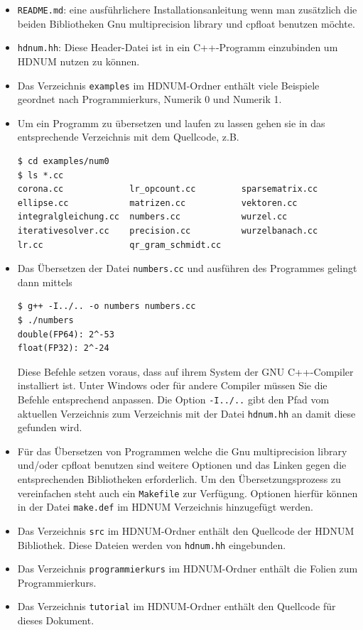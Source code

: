 \documentclass[a4paper,11pt]{article}
\theoremstyle{definition}
\begin{document}
\begin{itemize}
\item \lstinline{README.md}: eine ausführlichere Installationsanleitung wenn man zusätzlich die beiden Bibliotheken 
Gnu multiprecision library und cpfloat benutzen möchte.
\item \lstinline{hdnum.hh}: Diese Header-Datei ist in ein C++-Programm einzubinden um HDNUM
nutzen zu können.

\item Das Verzeichnis \lstinline{examples} im HDNUM-Ordner enthält viele Beispiele
geordnet nach Programmierkurs, Numerik 0 und Numerik 1.

\item Um ein Programm zu übersetzen und laufen zu lassen gehen sie in das entsprechende Verzeichnis mit dem Quellcode, z.B.
\begin{lstlisting}[basicstyle=\ttfamily\small,frame=single]
$ cd examples/num0
$ ls *.cc
corona.cc             lr_opcount.cc         sparsematrix.cc
ellipse.cc            matrizen.cc           vektoren.cc
integralgleichung.cc  numbers.cc            wurzel.cc
iterativesolver.cc    precision.cc          wurzelbanach.cc
lr.cc                 qr_gram_schmidt.cc
\end{lstlisting}


\item Das Übersetzen der Datei \lstinline{numbers.cc} und ausführen des Programmes gelingt dann mittels
\begin{lstlisting}[basicstyle=\ttfamily\small,frame=single]
$ g++ -I../.. -o numbers numbers.cc
$ ./numbers
double(FP64): 2^-53
float(FP32): 2^-24
\end{lstlisting}
Diese Befehle setzen voraus, dass auf ihrem System der GNU C++-Compiler installiert ist.
Unter Windows oder für andere Compiler müssen Sie die Befehle entsprechend anpassen.
Die Option \lstinline{-I../..} gibt den Pfad vom aktuellen Verzeichnis zum Verzeichnis mit der Datei \lstinline{hdnum.hh} an
damit diese gefunden wird. 
\item Für das Übersetzen von Programmen welche die Gnu multiprecision library und/oder cpfloat benutzen sind weitere
Optionen und das Linken gegen die entsprechenden Bibliotheken erforderlich. Um den Übersetzungsprozess zu vereinfachen 
steht auch ein \lstinline{Makefile} zur Verfügung. Optionen hierfür können in der Datei \lstinline{make.def} im HDNUM Verzeichnis 
hinzugefügt werden.
\item Das Verzeichnis \lstinline{src} im HDNUM-Ordner enthält den Quellcode
der HDNUM Bibliothek. Diese Dateien werden von \lstinline{hdnum.hh} eingebunden.
\item Das Verzeichnis \lstinline{programmierkurs} im HDNUM-Ordner enthält
die Folien zum Programmierkurs.
\item Das Verzeichnis \lstinline{tutorial} im HDNUM-Ordner enthält den Quellcode
für dieses Dokument.
\end{itemize}
\end{document}
